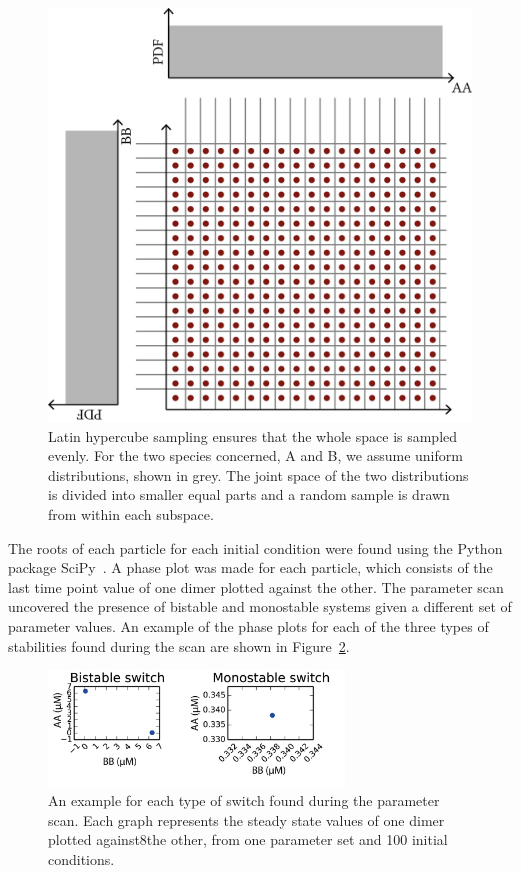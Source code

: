 \begin{figure}[ht]
\begin{center}
\includegraphics[scale=0.5]{../../chapters/chapterABCSysBio/images/LHS.png}
\caption[Latin Hypercube sampling]{\label{fig:lhs}Latin hypercube sampling ensures that the whole space is sampled evenly. For the two species concerned, A and B, we assume uniform distributions, shown in grey. The joint space of the two distributions is divided into smaller equal parts and a random sample is drawn from within each subspace.  }
\end{center}
\end{figure}

The roots of each particle for each initial condition were found using the Python package SciPy~\autocite{Scipy}. A phase plot was made for each particle, which consists of the last time point value of one dimer plotted against the other. The parameter scan uncovered the presence of bistable and monostable systems given a different set of parameter values. An example of the phase plots for each of the three types of stabilities found during the scan are shown in Figure~\ref{fig:stab exampl}.

\begin{figure}[htbp]
\centering
\includegraphics[width=0.7\textwidth]{../../chapters/chapterABCSysBio/images/phase_plots_param_scan.png}
\caption[Phase space examples of a monostable and a bistable switch]{\label{fig:stab exampl}An example for each type of switch found during the parameter scan. Each graph represents the steady state values of one dimer plotted against8the other, from one parameter set and 100 initial conditions.}
\end{figure}

